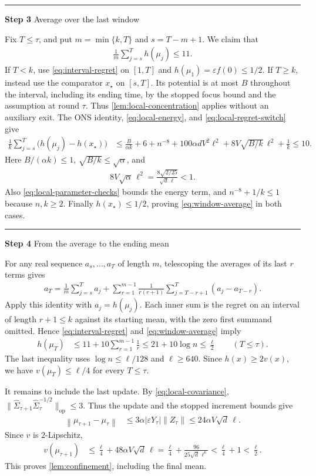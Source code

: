 \documentclass[11pt]{article}
\newcommand{\proofstep}[2]{%
    \par\medskip
    \noindent
    \textcolor{blue!55!black}{\rule{2pt}{1.2em}}%
    \hspace{0.6em}%
    {\sffamily\bfseries\color{blue!55!black}Step #1}%
    \quad
    {\sffamily #2}%
    \par\smallskip
}
\newcommand{\op}{\mathrm{op}}
\newcommand{\1}{\mathbf 1}
\newcommand{\eps}{\varepsilon}
\newcommand{\norm}[1]{\left\lVert #1\right\rVert}
\begin{document}
\proofstep{3}{Average over the last window}
Fix $T\leq\tau$, and put $m=\min\{k,T\}$ and $s=T-m+1$. We claim that
\begin{align}
    \frac1m\sum_{j=s}^T h(\mu_j)\leq11.
    \label{eq:window-average}
\end{align}
If $T<k$, use \eqref{eq:interval-regret} on $[1,T]$ and
$h(\mu_1)=\eps f(0)\leq1/2$.
If $T\geq k$, instead use the comparator $x_\star$ on $[s,T]$.
Its potential is at most $B$ throughout the interval, including its
ending time, by the stopped focus bound and the assumption at round
$\tau$. Thus \cref{lem:local-concentration} applies without an auxiliary
exit. The ONS identity, \eqref{eq:local-energy}, and
\eqref{eq:local-regret-switch} give
\begin{align}
    \frac1k\sum_{j=s}^T\bigl(h(\mu_j)-h(x_\star)\bigr)
     & \leq\frac{B}{\alpha k}+6+n^{-8}
    +100\alpha dV^2\ell^2
    +8V\sqrt{B/k}\,\ell^2+\frac1k
    \leq10.
\end{align}
Here $B/(\alpha k)\leq1$, $\sqrt{B/k}\leq\sqrt\alpha$, and
\begin{align}
    8V\sqrt\alpha\,\ell^2
    =\frac{8\sqrt{2/25}}{\sqrt d\,\ell}<1.
\end{align}
Also \eqref{eq:local-parameter-checks} bounds the energy term, and
$n^{-8}+1/k\leq1$ because $n,k\geq2$.
Finally $h(x_\star)\leq1/2$, proving \eqref{eq:window-average} in both
cases.

\proofstep{4}{From the average to the ending mean}
For any real sequence $a_s,\ldots,a_T$ of length $m$, telescoping the
averages of its last $r$ terms gives
\begin{align}
    a_T
    =\frac1m\sum_{j=s}^T a_j
    +\sum_{r=1}^{m-1}\frac1{r(r+1)}
    \sum_{j=T-r+1}^T(a_j-a_{T-r}).
    \label{eq:suffix-average-identity}
\end{align}
Apply this identity with $a_j=h(\mu_j)$. Each inner sum is the regret on
an interval of length $r+1\leq k$ against its starting mean, with the
zero first summand omitted. Hence \eqref{eq:interval-regret} and
\eqref{eq:window-average} imply
\begin{align}
    h(\mu_T)
     & \leq11+10\sum_{r=1}^{m-1}\frac1r
    \leq21+10\log n
    \leq\frac\ell2
    \qquad(T\leq\tau).
    \label{eq:last-iterate-extension}
\end{align}
The last inequality uses $\log n\leq\ell/128$ and $\ell\geq640$.
Since $h(x)\geq2v(x)$, we have $v(\mu_T)\leq\ell/4$ for every
$T\leq\tau$.

It remains to include the last update. By \eqref{eq:local-covariance},
$\|\widehat\Sigma_{\tau+1}\widehat\Sigma_\tau^{-1/2}\|_{\op}\leq3$.
Thus the update and the stopped increment bounds give
\begin{align}
    \norm{\mu_{\tau+1}-\mu_\tau}
     & \leq3\alpha|\eps Y_\tau|\norm{Z_\tau}
    \leq24\alpha V\sqrt d\,\ell.
\end{align}
Since $v$ is $2$-Lipschitz,
\begin{align}
    v(\mu_{\tau+1})
     & \leq\frac\ell4+48\alpha V\sqrt d\,\ell
    =\frac\ell4+\frac{96}{25\sqrt d\,\ell^6}
    <\frac\ell4+1<\frac\ell2.
\end{align}
This proves \cref{lem:confinement}, including the final mean.
\end{document}
